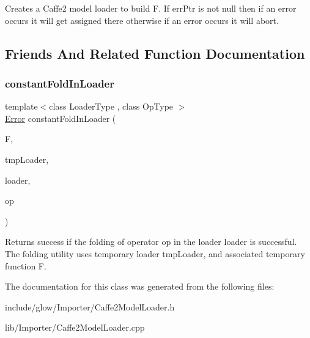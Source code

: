 Creates a Caffe2 model loader to build {\ttfamily F}. If {\ttfamily err\+Ptr} is not null then if an error occurs it will get assigned there otherwise if an error occurs it will abort. 

\subsection{Friends And Related Function Documentation}
\mbox{\label{classglow_1_1_caffe2_model_loader_a80921ed3db9c22615413812ec08923de}} 
\subsubsection{\texorpdfstring{constant\+Fold\+In\+Loader}{constantFoldInLoader}}
{\footnotesize\ttfamily template$<$class Loader\+Type , class Op\+Type $>$ \\
\hyperlink{namespaceglow_afdb176c3a672ef66db0ecfc19a8d39bf}{Error} constant\+Fold\+In\+Loader (\begin{DoxyParamCaption}\item[{\hyperlink{classglow_1_1_function}{Function} $\ast$}]{F,  }\item[{Loader\+Type \&}]{tmp\+Loader,  }\item[{Loader\+Type $\ast$}]{loader,  }\item[{const Op\+Type \&}]{op }\end{DoxyParamCaption})\hspace{0.3cm}{\ttfamily [friend]}}

\begin{DoxyReturn}{Returns}
success if the folding of operator {\ttfamily op} in the loader {\ttfamily loader} is successful. The folding utility uses temporary loader {\ttfamily tmp\+Loader}, and associated temporary function {\ttfamily F}. 
\end{DoxyReturn}


The documentation for this class was generated from the following files\+:\begin{DoxyCompactItemize}
\item 
include/glow/\+Importer/Caffe2\+Model\+Loader.\+h\item 
lib/\+Importer/Caffe2\+Model\+Loader.\+cpp\end{DoxyCompactItemize}
